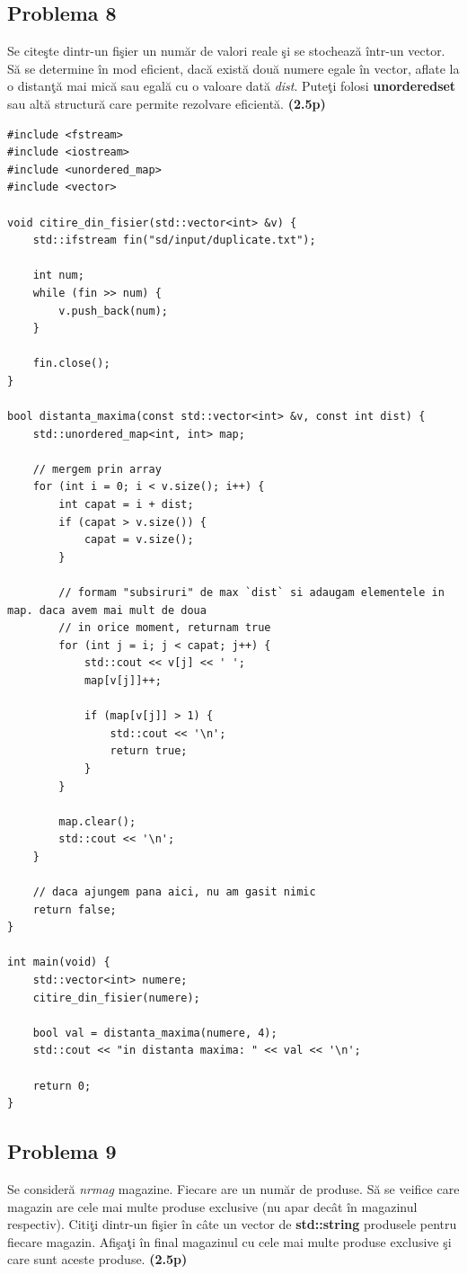 \documentclass[12pt]{article}
\begin{document}
\newpage

\subsection{Problema 8}
Se citeşte dintr-un fişier un număr de valori reale şi se stochează într-un vector. Să se determine în mod eficient, dacă există două numere egale în vector, aflate la o distanţă mai mică sau egală cu o valoare dată \textit{dist}. Puteţi folosi \textbf{unordered\textunderscore set} sau altă structură care permite rezolvare eficientă.
\textbf{(2.5p)}\newline

\begin{lstlisting}
#include <fstream>
#include <iostream>
#include <unordered_map>
#include <vector>

void citire_din_fisier(std::vector<int> &v) {
    std::ifstream fin("sd/input/duplicate.txt");

    int num;
    while (fin >> num) {
        v.push_back(num);
    }

    fin.close();
}

bool distanta_maxima(const std::vector<int> &v, const int dist) {
    std::unordered_map<int, int> map;

    // mergem prin array
    for (int i = 0; i < v.size(); i++) {
        int capat = i + dist;
        if (capat > v.size()) {
            capat = v.size();
        }

        // formam "subsiruri" de max `dist` si adaugam elementele in map. daca avem mai mult de doua
        // in orice moment, returnam true
        for (int j = i; j < capat; j++) {
            std::cout << v[j] << ' ';
            map[v[j]]++;

            if (map[v[j]] > 1) {
                std::cout << '\n';
                return true;
            }
        }

        map.clear();
        std::cout << '\n';
    }

    // daca ajungem pana aici, nu am gasit nimic
    return false;
}

int main(void) {
    std::vector<int> numere;
    citire_din_fisier(numere);

    bool val = distanta_maxima(numere, 4);
    std::cout << "in distanta maxima: " << val << '\n';

    return 0;
}
\end{lstlisting}

\newpage

\subsection{Problema 9}
 Se consideră \textit{nr\textunderscore mag} magazine. Fiecare are un număr de produse. Să se veifice care magazin are cele mai multe produse exclusive (nu apar decât în magazinul respectiv). Citiţi dintr-un fişier în câte un vector de \textbf{std::string} produsele pentru fiecare magazin. Afişaţi în final magazinul cu cele mai multe produse exclusive şi care sunt aceste produse.
\textbf{(2.5p)}\newline
\end{document}

